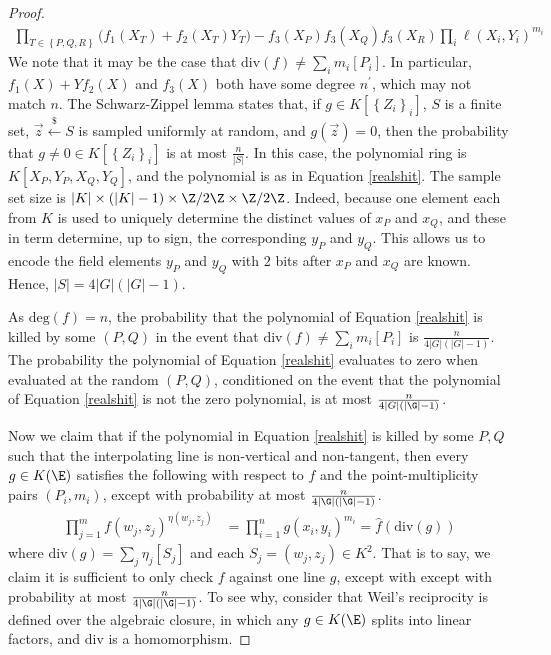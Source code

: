 \documentclass[11pt,letterpaper]{article}
\theoremstyle{definition}
\newcommand{\6}{\mathbf}
\newcommand{\7}{\mathcal}
\newcommand{\lsamp}{\xleftarrow{\$}}
\begin{document}
\begin{proof}
\begin{align}
\prod_{T \in \left\{P, Q, R\right\}}\big(f_1(X_T)+f_2(X_T)Y_T\big) -  
f_3(X_P)f_3(X_Q)f_3(X_R) \prod_i \ell(X_i, Y_i)^{m_i} \label{realshit} 
\end{align}
We note that it may be the case that $\text{div}(f) \neq \sum_i m_i [P_i]$. In particular, $f_1(X) + Yf_2(X)$ and $f_3(X)$ both have some degree $n^\prime$, which may not match $n$. The Schwarz-Zippel lemma 
states that, if $g \in K[\left\{Z_i\right\}_i]$, $S$ is a finite set, $\vec{z} \lsamp S$ is sampled uniformly at random, and $g(\vec{z}) = 0$, then the probability that $g \neq 0 \in K[\left\{Z_i\right\}_i]$ is at most $\frac{n}{\left|S\right|}$. In this case, the polynomial ring is $K[X_P,Y_P,X_Q,Y_Q]$, and the polynomial is as in Equation \ref{realshit}.
The sample set size is $\left|K\right| \times \left(\left|K\right| - 1\right) \times \Z/2\Z \times \Z/2\Z$. Indeed, because one element each from $K$ is used to uniquely determine the distinct values of $x_P$ and $x_Q$, and these in term determine, up to sign, the corresponding $y_P$ and $y_Q$. This allows us to encode the field elements $y_P$ and $y_Q$ with $2$ bits after $x_P$ and $x_Q$ are known. Hence, $\left|S\right| = 4\left|G\right|\left(\left|G\right|-1\right)$.

As $\text{deg}(f) = n$, the probability that the polynomial of Equation \ref{realshit} is killed by some $(P, Q)$ in the event that $\text{div}(f) \neq \sum_i m_i [P_i]$ is $\frac{n}{4\left|G\right|\left(\left|G\right|-1\right)}$.   The probability the polynomial of Equation \ref{realshit} evaluates to zero when evaluated at the random $(P, Q)$, conditioned on the event that the polynomial of Equation \ref{realshit} is not the zero polynomial, is at most $\frac{n}{4\left|G\right|\left(\left|\G\right|-1\right)}$.  %

Now we claim that if the polynomial in Equation \ref{realshit} is killed by some $P, Q$ such that the interpolating line is non-vertical and non-tangent, then every $g \in K(\E)$ satisfies the following with respect to $f$ and the point-multiplicity pairs $(P_i, m_i)$,  except with probability at most $\frac{n}{4\left|\G\right|\left(\left|\G\right|-1\right)}$.
\begin{align}
\prod_{j=1}^{m} f(w_j, z_j)^{\eta(w_j, z_j)} &= \prod_{i=1}^{n} g(x_i, y_i)^{m_i} = \widehat{f}(\text{div}(g)) 
\label{wanted}
\end{align} where $\text{div}(g) = \sum_j \eta_j [S_j]$ and each $S_j = (w_j, z_j) \in K^2$. That is to say, we claim it is sufficient to only check $f$ against one line $g$, except with except with probability at most $\frac{n}{4\left|\G\right|\left(\left|\G\right|-1\right)}$. To see why, consider that Weil's reciprocity is defined over the algebraic closure, in which any $g \in K(\E)$ splits into linear factors, and $\text{div}$ is a homomorphism.
\end{proof}
\end{document}
